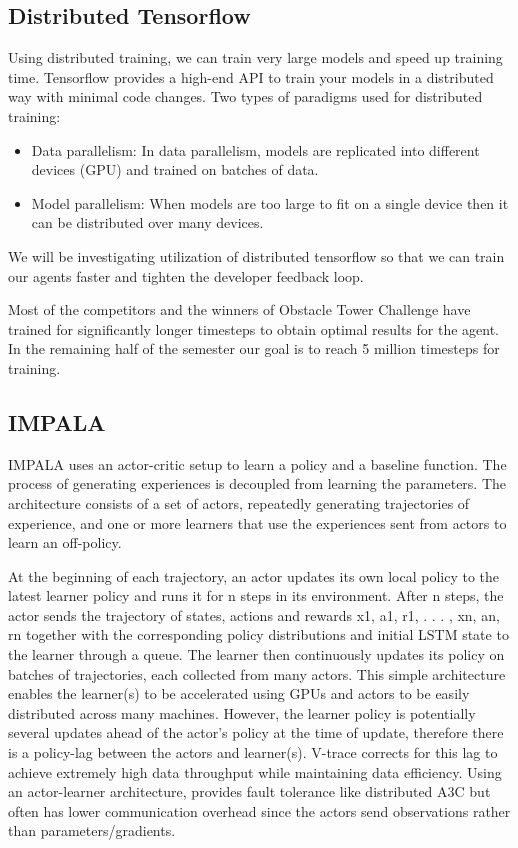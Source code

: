 \documentclass[conference]{IEEEtran}
\begin{document}
\subsection{\textbf{Distributed Tensorflow}}

Using distributed training, we can train very large models and speed up training time. Tensorflow provides a high-end API to train your models in a distributed way with minimal code changes.  Two types of paradigms used for distributed training:
\begin{itemize}
\item Data parallelism: In data parallelism, models are replicated into different devices (GPU) and trained on batches of data.
\item Model parallelism: When models are too large to fit on a single device then it can be distributed over many devices.
\end{itemize}
We will be investigating utilization of distributed tensorflow so that we can train our agents faster and tighten the developer feedback loop.

Most of the competitors and the winners of Obstacle Tower Challenge have trained for significantly longer timesteps to obtain optimal results for the agent. In the remaining half of the semester our goal is to reach 5 million timesteps for training.

\subsection{\textbf{IMPALA}}

IMPALA uses an actor-critic setup to learn a policy and a baseline function. The process of generating experiences is decoupled from learning the parameters. The architecture consists of a set of actors, repeatedly generating trajectories of experience, and one or more learners that use the experiences sent from actors to learn an off-policy.

At the beginning of each trajectory, an actor updates its own local policy to the latest learner policy and runs it for n steps in its environment. After n steps, the actor sends the trajectory of states, actions and rewards x1, a1, r1, . . . , xn, an, rn together with the corresponding policy distributions and initial LSTM state to the learner through a queue. The learner then continuously updates its policy on batches of trajectories, each collected from many actors. This simple architecture enables the learner(s) to be accelerated using GPUs and actors to be easily distributed across many machines. However, the learner policy is potentially several updates ahead of the actor’s policy at the time of update, therefore there is a policy-lag between the actors and learner(s). V-trace corrects for this lag to achieve extremely high data throughput while maintaining data efficiency. Using an actor-learner architecture, provides fault tolerance like distributed A3C but often has lower communication overhead since the actors send observations rather than parameters/gradients.
\end{document}
